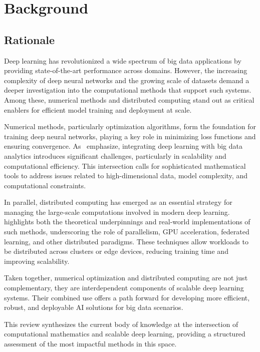 \section{Background}

\subsection{Rationale}

Deep learning has revolutionized a wide spectrum of big data applications by providing state-of-the-art performance across domains. 
However, the increasing complexity of deep neural networks and the growing scale of datasets demand a deeper investigation into 
the computational methods that support such systems. Among these, numerical methods and distributed computing stand out as critical 
enablers for efficient model training and deployment at scale.

Numerical methods, particularly optimization algorithms, form the foundation for training deep neural networks, playing a key role 
in minimizing loss functions and ensuring convergence. As~\cite{najafabadi2015deep} emphasize, integrating deep learning with 
big data analytics introduces significant challenges, particularly in scalability and computational efficiency. 
This intersection calls for sophisticated mathematical tools to address issues related to high-dimensional data, model complexity, 
and computational constraints.

In parallel, distributed computing has emerged as an essential strategy for managing the large-scale computations involved in 
modern deep learning.~\cite{yan2023computational} highlights both the theoretical underpinnings and real-world implementations of such methods, 
underscoring the role of parallelism, GPU acceleration, federated learning, and other distributed paradigms. 
These techniques allow workloads to be distributed across clusters or edge devices, reducing training time and improving scalability.


Taken together, numerical optimization and distributed computing are not just complementary, they are interdependent components 
of scalable deep learning systems. Their combined use offers a path forward for developing more efficient, robust, and deployable 
AI solutions for big data scenarios.

This review synthesizes the current body of knowledge at the intersection of computational mathematics and scalable deep learning, 
providing a structured assessment of the most impactful methods in this space.

